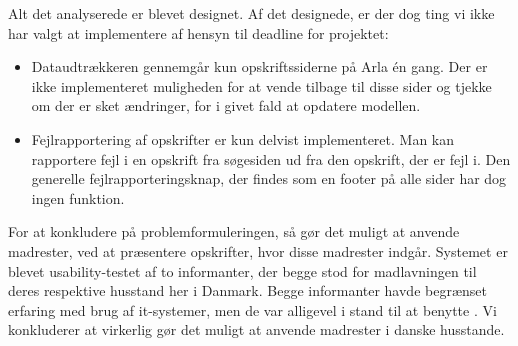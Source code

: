 Alt det analyserede er blevet designet. Af det designede, er der dog ting vi ikke har valgt at implementere af hensyn til deadline for projektet:
\begin{itemize}
\item Dataudtrækkeren gennemgår kun opskriftssiderne på Arla én gang. Der er ikke implementeret muligheden for at vende tilbage til disse sider og tjekke om der er sket ændringer, for i givet fald at opdatere modellen.
\item Fejlrapportering af opskrifter er kun delvist implementeret. Man kan rapportere fejl i en opskrift fra søgesiden ud fra den opskrift, der er fejl i. Den generelle fejlrapporteringsknap, der findes som en footer på alle sider har dog ingen funktion.
\end{itemize}

For at konkludere på problemformuleringen, så gør \Foodl det muligt at anvende madrester, ved at præsentere opskrifter, hvor disse madrester indgår. Systemet er blevet usability-testet af to informanter, der begge stod for madlavningen til deres respektive husstand her i Danmark. Begge informanter havde begrænset erfaring med brug af it-systemer, men de var alligevel i stand til at benytte \Foodl. Vi konkluderer at \Foodl virkerlig gør det muligt at anvende madrester i danske husstande.



